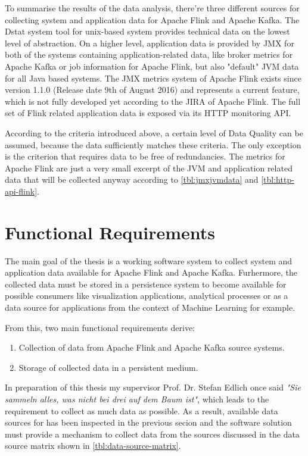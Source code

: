 To summarise the results of the data analysis, there're three different sources for collecting system and application
data for Apache Flink and Apache Kafka. The Dstat system tool for unix-based system provides technical data on the
lowest level of abstraction. On a higher level, application data is provided by JMX for both of the systems containing
application-related data, like broker metrics for Apache Kafka or job information for Apache Flink, but also "default"
JVM data for all Java based systems. The JMX metrics system of Apache Flink exists since version 1.1.0 (Release date
9th of August 2016) and represents a current feature, which is not fully developed yet according to the JIRA of
Apache Flink. The full set of Flink related application data is exposed via its HTTP
monitoring API.

According to the criteria introduced above, a certain level of Data Quality can be assumed, because the data sufficiently
matches these criteria. The only exception is the criterion that requires data to be free of redundancies. The metrics
for Apache Flink are just a very small excerpt of the JVM and application related data that will be collected anyway according
to \autoref{tbl:jmxjvmdata} and \autoref{tbl:http-api-flink}.

\section{Functional Requirements}

The main goal of the thesis is a working software system to collect system and application data available
for Apache Flink and Apache Kafka. Furhermore, the collected data must be stored in a
persistence system to become available for possible consumers like visualization applications,
analytical processes or as a data source for applications from the context of Machine Learning
for example.

From this, two main functional requirements derive:
\begin{enumerate}
    \item Collection of data from Apache Flink and Apache Kafka source systems.
    \item Storage of collected data in a persistent medium.
\end{enumerate}

In preparation of this thesis my supervisor Prof. Dr. Stefan Edlich once said \textit{"Sie sammeln
alles, was nicht bei drei auf dem Baum ist"}, which leads to the requirement to collect as much data
as possible. As a result, available data sources for has been inspected in the previous secion and the
software solution must provide a mechanism to collect data from the sources discussed in the data source
matrix shown in \autoref{tbl:data-source-matrix}.

